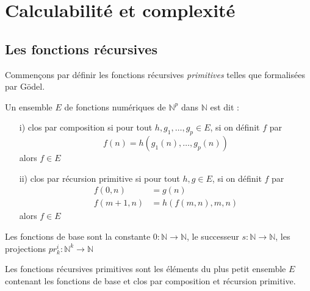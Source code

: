 \chapter{Calculabilité et complexité}

\section{Les fonctions récursives}
Commençons  par définir les fonctions récursives \textit{primitives} telles que formalisées par
Gödel.

Un ensemble $E$ de fonctions numériques de $\mathbb{N}^p$ dans $\mathbb{N}$ est dit :
\begin{itemize}
	\item [i)] clos par composition si pour tout $h, g_1, \dots,g_p \in E$, si on définit $f$ par
	 $$f(n)=h(g_1(n), \dots, g_p(n))$$
	alors $f \in E$
	\item [ii)] clos par récursion primitive si pour tout $h,g \in E$, si on définit $f$ par
	\begin{align*}
	f(0,n) &= g(n) \\
	f(m+1, n) &= h(f(m,n),m,n)
\end{align*}
alors $f \in E$
\end{itemize}
Les fonctions de base sont la constante $0 : \mathbb{N} \rightarrow \mathbb{N}$, le successeur 
$s :\mathbb{N} \rightarrow \mathbb{N}$, les projections $pr_k^i : \mathbb{N}^k \rightarrow \mathbb{N}$

Les fonctions récursives primitives sont les éléments du plus petit ensemble $E$ contenant les
fonctions de base et clos par composition et récursion primitive.

